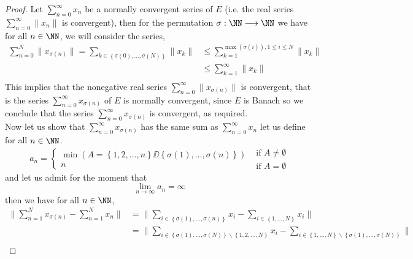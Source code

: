 	\begin{proof}
	Let $\sum_{n=0}^{\infty}  x_{n} $  be a normally convergent series of $E $ (i.e. 
	the real series $\sum_{n=0}^{\infty}  \| x_{n} \|  $ is convergent), then 
	for the permutation $\sigma  : \NN \longrightarrow \NN $ we have for all $n\in  \NN$, 
	we will consider the series,
	\begin{align*}
		\sum_{n=0}^{N}  \| x_{\sigma (n)   }   \|  = 
		\sum_{k \in  
		\left\{ \sigma (0) , \hdots , \sigma (N)      \right\}}^{}  
		\| x_{k} \|  &\leq 
		\sum_{k=1}^{\max (\sigma (i)   ) , 1 \leq i \leq N} 
		\| x_{k} \|  \\
	     & \leq 
	     \sum_{k=1}^{\infty } \| x_{k} \|  \\
	\end{align*}
	This implies that the nonegative real series $\sum_{n=0}^{\infty}  \| x_{\sigma (n)   } \|  $ 
	is convergent, that is the series $\sum_{n=0}^{\infty}  x_{\sigma (n)   }$ of $E $ is
	normally convergent, since $E $ is Banach so we conclude that the series 
	$\sum_{n=0}^{\infty}  x_{\sigma (n)}$ is convergent, as required.\\
	Now let us show that $\sum_{n=0}^{\infty}  x_{\sigma (n)   } $  
	has the same sum as $\sum_{n=0}^{\infty}  x_{n} $  
	let us define for all $n \in \NN $. 
	\[
	a_{n} = 
	\begin{cases}
		 \min \left( A = \left\{ 1, 2, \hdots ,n  \right\} \DD  
		\left\{ \sigma (1) , \hdots , \sigma (n)      \right\}\right)  
		\\
		n
	\end{cases} 
	\begin{gathered}  
		\text{ if } A \neq \emptyset   \\  
		\text{ if }   A = \emptyset 
	\end{gathered}
	\]
	and let us admit for the moment that 
	\[
	\lim_{n \to \infty} a_{n} = \infty 
	\]
	then we have for all $n \in \NN $, 
	\begin{align*}
		\| \sum_{n=1}^{N} x_{\sigma (n)   }- \sum_{n=1}^{N} x_{n} \| &=
		\| \sum_{i \in \left\{ 
		\sigma (1) , \hdots , \sigma (n)     \right\}}^{} x_{i} - 
		\sum_{i \in \left\{ 1, \hdots , N \right\}}^{} x_{i}\|  \\
									     &= 
					\| \sum_{i \in 
					\left\{ \sigma (1) , \hdots , 
				\sigma (N)   \right\} \backslash 
		\left\{ 1,2, \hdots , N \right\}}^{} x_{i} - 
		\sum_{i \in \left\{ 1, \hdots , N \right\} \backslash 
		\left\{ \sigma (1) , \hdots , \sigma (N)      \right\}}^{} \| 
		\\

\end{align*}
\end{proof}
